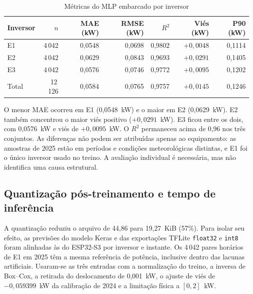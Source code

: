\begin{table}[htbp]
    \centering
    \small
    \caption{Métricas do MLP embarcado por inversor}
    \label{tab:resultados-metricas-embarcadas}
    \begin{tabular}{lrrrrrr}
        \toprule
        Inversor & $n$ & MAE (kW) & RMSE (kW) & $R^2$ & Viés (kW) & P90 (kW) \\
        \midrule
        E1 & 4\,042 & 0,0548 & 0,0698 & 0,9802 & $+0,0048$ & 0,1114 \\
        E2 & 4\,042 & 0,0629 & 0,0843 & 0,9693 & $+0,0291$ & 0,1405 \\
        E3 & 4\,042 & 0,0576 & 0,0746 & 0,9772 & $+0,0095$ & 0,1202 \\
        \midrule
        Total & 12\,126 & 0,0584 & 0,0765 & 0,9757 & $+0,0145$ & 0,1246 \\
        \bottomrule
    \end{tabular}
\end{table}

O menor MAE ocorreu em E1 (0,0548~kW) e o maior
em E2 (0,0629~kW). E2 também concentrou o maior viés positivo
($+0,0291$~kW). E3 ficou entre os dois, com 0,0576~kW e viés de
$+0,0095$~kW. O $R^2$ permaneceu acima de 0,96 nos três conjuntos. As
diferenças não podem ser atribuídas apenas ao equipamento: as amostras de
2025 estão em períodos e condições meteorológicas distintas, e E1 foi o
único inversor usado no treino. A avaliação individual é necessária, mas não
identifica uma causa estrutural.

\subsection{Quantização pós-treinamento e tempo de inferência}
\label{sec:resultados-tempos-embarcados}

A quantização reduziu o arquivo de 44,86 para 19,27~KiB (57\%). Para isolar
seu efeito, as previsões do modelo Keras e das exportações TFLite
\texttt{float32} e \texttt{int8} foram alinhadas às do ESP32-S3 por inversor
e instante. Os 4\,042 pares horários de E1 em 2025 têm a mesma referência de
potência, inclusive dentro das lacunas artificiais. Usaram-se as três
entradas com a normalização do treino, a inversa de Box--Cox, a retirada do
deslocamento de 0,001~kW, o ajuste de viés de $-0,059399$~kW da calibração
de 2024 e a limitação física a $[0,2]$~kW.

